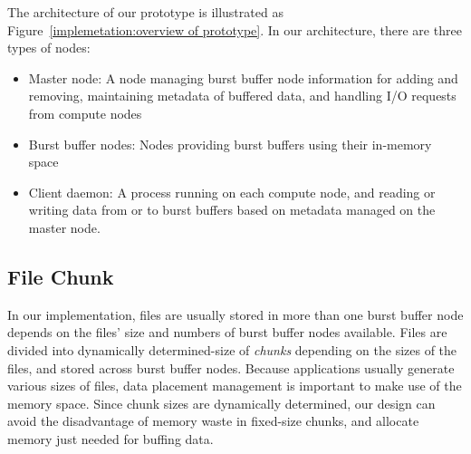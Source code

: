 The architecture of our prototype is illustrated as
Figure~\ref{implemetation:overview of prototype}.
In our architecture, there are three
types of nodes:
\begin{itemize}
	\item Master node: A node managing burst buffer node information for adding and
	removing, maintaining metadata of buffered data, and handling I/O requests
	from compute nodes
	\item Burst buffer nodes: Nodes providing burst buffers using their
	in-memory space
	\item Client daemon: A process running on each compute node, and
	reading or writing data from or to burst buffers based on metadata managed on
	the master node.
\end{itemize}

\subsection{File Chunk}
In our implementation, files are usually stored in more than one burst buffer node depends on the files'
size and numbers of burst buffer nodes available.
Files are divided into dynamically determined-size of \emph{chunks} depending
on the sizes of the files, and stored across burst buffer nodes.
Because applications usually generate various sizes of files, data placement
management is important to make use of the memory space.
Since chunk sizes are dynamically determined, our design can avoid
the disadvantage of memory waste in fixed-size chunks, and allocate
memory just needed for buffing data.

